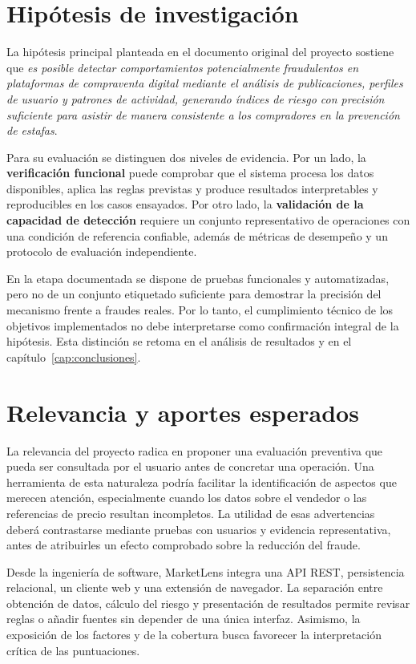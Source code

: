 \section{Hipótesis de investigación}\label{sec:ml-hipotesis}

La hipótesis principal planteada en el documento original del proyecto sostiene que \emph{es posible detectar comportamientos potencialmente fraudulentos en plataformas de compraventa digital mediante el análisis de publicaciones, perfiles de usuario y patrones de actividad, generando índices de riesgo con precisión suficiente para asistir de manera consistente a los compradores en la prevención de estafas}.

Para su evaluación se distinguen dos niveles de evidencia. Por un lado, la \textbf{verificación funcional} puede comprobar que el sistema procesa los datos disponibles, aplica las reglas previstas y produce resultados interpretables y reproducibles en los casos ensayados. Por otro lado, la \textbf{validación de la capacidad de detección} requiere un conjunto representativo de operaciones con una condición de referencia confiable, además de métricas de desempeño y un protocolo de evaluación independiente.

En la etapa documentada se dispone de pruebas funcionales y automatizadas, pero no de un conjunto etiquetado suficiente para demostrar la precisión del mecanismo frente a fraudes reales. Por lo tanto, el cumplimiento técnico de los objetivos implementados no debe interpretarse como confirmación integral de la hipótesis. Esta distinción se retoma en el análisis de resultados y en el capítulo~\ref{cap:conclusiones}.

\section{Relevancia y aportes esperados}\label{sec:ml-relevancia}

La relevancia del proyecto radica en proponer una evaluación preventiva que pueda ser consultada por el usuario antes de concretar una operación. Una herramienta de esta naturaleza podría facilitar la identificación de aspectos que merecen atención, especialmente cuando los datos sobre el vendedor o las referencias de precio resultan incompletos. La utilidad de esas advertencias deberá contrastarse mediante pruebas con usuarios y evidencia representativa, antes de atribuirles un efecto comprobado sobre la reducción del fraude.

Desde la ingeniería de software, MarketLens integra una API REST, persistencia relacional, un cliente web y una extensión de navegador. La separación entre obtención de datos, cálculo del riesgo y presentación de resultados permite revisar reglas o añadir fuentes sin depender de una única interfaz. Asimismo, la exposición de los factores y de la cobertura busca favorecer la interpretación crítica de las puntuaciones.

